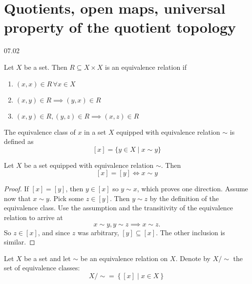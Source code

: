 \section{Quotients, open maps, universal property of the quotient topology}
07.02

\begin{definition}
   Let \( X \) be a set. Then \( R \subseteq X \times X \) 
   is an equivalence relation if
   \begin{enumerate}
     \item \( (x, x) \in R \, \forall x \in X \)
     \item \( (x, y) \in R \implies (y, x) \in R \)
     \item \( (x, y) \in R, (y, z) \in R \implies (x, z) \in R \)
   \end{enumerate}
\end{definition}

\begin{definition}
   The equivalence class of \( x \)
   in a set \( X \) equipped with equivalence relation
   \( \sim \) is defined as
   \[
     [x] = \{ y \in X \mid x \sim y \} 
   \]
\end{definition}

\begin{lemma}
    Let \( X \) be a set equipped
    with equivalence relation \( \sim \).
    Then
    \[
      [x] = [y] \iff x \sim y
    \]
\end{lemma}

\begin{proof}
  If \( [x] = [y] \), then \( y \in [x] \) so \( y \sim x \), which proves one direction.
  Assume now that \( x \sim y \). Pick some \( z \in [y] \).
  Then \( y \sim z \) by the definition of the equivalence class.
  Use the assumption and the transitivity of the equivalence relation to arrive at
  \[
    x \sim y, y \sim z \implies x \sim z.
  \]
  So \( z \in [x] \), and since \( z \) was arbitrary, \( [y] \subseteq [x] \). The other inclusion is similar.
\end{proof}

\begin{definition}
  Let \( X \) be a set and let \( {\sim} \) be an equivalence relation
    on \( X \). Denote by \( X /{\sim} \) the set of equivalence classes:
    \[
      X /{\sim} = \left\{ [x] \mid x \in X \right\} 
    \]
\end{definition}

